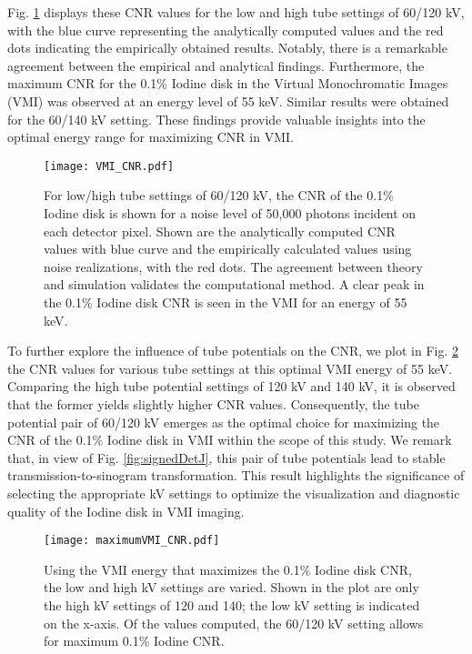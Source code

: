 \documentclass[12pt,twoside]{article}   %
\begin{document}
Fig. \ref{fig:VMI-CNRvsE} displays these CNR values for the low and high tube settings of 60/120 kV, with the blue curve representing the analytically computed values and the red dots indicating the empirically obtained results. Notably, there is a remarkable agreement between the empirical and analytical findings. Furthermore, the maximum CNR for the 0.1\% Iodine disk in the Virtual Monochromatic Images (VMI) was observed at an energy level of 55 keV. Similar results were obtained for the 60/140 kV setting. These findings provide valuable insights into the optimal energy range for maximizing CNR in VMI. 

\begin{figure}[H]
\centering
\texttt{[image: VMI\_CNR.pdf]}
 
\caption{For low/high tube settings of 60/120 kV,
the CNR of the 0.1\% Iodine disk is shown for a noise
level of 50,000 photons incident on each detector
pixel. Shown are the analytically computed CNR
values with blue curve and the empirically calculated
values using noise realizations, with the red dots.
The agreement between theory and simulation
validates the computational method. A clear peak in
the 0.1\% Iodine disk CNR is seen in the VMI for an
energy of 55 keV.}
\label{fig:VMI-CNRvsE}
\end{figure}

To further explore the influence of tube potentials on the CNR, we plot in Fig. \ref{fig:iodineCNR} the CNR values for various tube settings at this optimal VMI energy of 55 keV. Comparing the high tube potential settings of 120 kV and 140 kV, it is observed that the former yields slightly higher CNR values. Consequently, the tube potential pair of 60/120 kV emerges as the optimal choice for maximizing the CNR of the 0.1\% Iodine disk in VMI within the scope of this study. We remark that, in view of Fig. \ref{fig:signedDetJ}, this pair of tube potentials lead to stable transmission-to-sinogram transformation. This result highlights the significance of selecting the appropriate kV settings to optimize the visualization and diagnostic quality of the Iodine disk in VMI imaging. 

\begin{figure}[H]
\centering
\texttt{[image: maximumVMI\_CNR.pdf]}
 
\caption{Using the VMI energy that maximizes the
0.1\% Iodine disk CNR, the low and high kV settings are
varied. Shown in the plot are only the high kV
settings of 120 and 140; the low kV setting is
indicated on the x-axis. Of the values computed, the
60/120 kV setting allows for maximum 0.1\% Iodine CNR.}
\label{fig:iodineCNR}
\end{figure}
\end{document}
